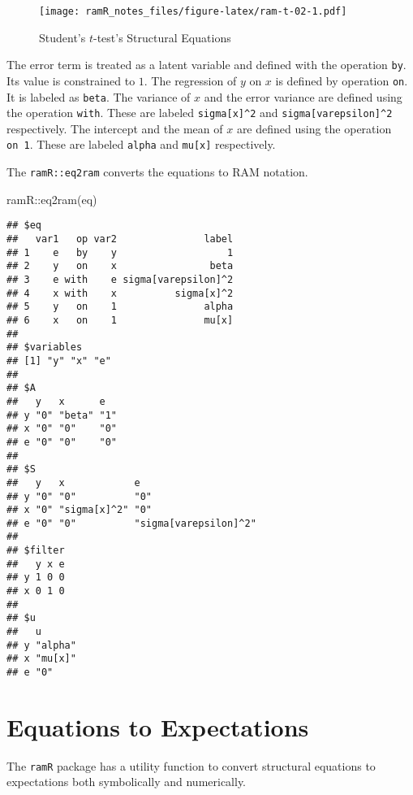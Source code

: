 \documentclass[
]{book}
\newenvironment{Shaded}{\begin{snugshade}}{\end{snugshade}}
\newcommand{\FunctionTok}[1]{\textcolor[rgb]{0.00,0.00,0.00}{#1}}
\newcommand{\NormalTok}[1]{#1}
\newcommand{\SpecialCharTok}[1]{\textcolor[rgb]{0.00,0.00,0.00}{#1}}
\theoremstyle{definition}
\theoremstyle{definition}
\theoremstyle{definition}
\theoremstyle{remark}
\begin{document}
\begin{figure}
\centering
\texttt{[image: ramR\_notes\_files/figure-latex/ram-t-02-1.pdf]}
\caption{\label{fig:ram-t-02}Student's \(t\)-test's Structural Equations}
\end{figure}

The error term is treated as a latent variable
and defined with the operation \texttt{by}.
Its value is constrained to \(1\).
The regression of \(y\) on \(x\) is defined by operation \texttt{on}.
It is labeled as \texttt{beta}.
The variance of \(x\) and the error variance
are defined using the operation \texttt{with}.
These are labeled \texttt{sigma{[}x{]}\^{}2} and \texttt{sigma{[}varepsilon{]}\^{}2} respectively.
The intercept and the mean of \(x\) are defined using the operation \texttt{on\ 1}.
These are labeled \texttt{alpha} and \texttt{mu{[}x{]}} respectively.

The \texttt{ramR::eq2ram} converts the equations to RAM notation.

\begin{Shaded}
\begin{Highlighting}[]
\NormalTok{ramR}\SpecialCharTok{::}\FunctionTok{eq2ram}\NormalTok{(eq)}
\end{Highlighting}
\end{Shaded}

\begin{verbatim}
## $eq
##   var1   op var2               label
## 1    e   by    y                   1
## 2    y   on    x                beta
## 3    e with    e sigma[varepsilon]^2
## 4    x with    x          sigma[x]^2
## 5    y   on    1               alpha
## 6    x   on    1               mu[x]
## 
## $variables
## [1] "y" "x" "e"
## 
## $A
##   y   x      e  
## y "0" "beta" "1"
## x "0" "0"    "0"
## e "0" "0"    "0"
## 
## $S
##   y   x            e                    
## y "0" "0"          "0"                  
## x "0" "sigma[x]^2" "0"                  
## e "0" "0"          "sigma[varepsilon]^2"
## 
## $filter
##   y x e
## y 1 0 0
## x 0 1 0
## 
## $u
##   u      
## y "alpha"
## x "mu[x]"
## e "0"
\end{verbatim}

\hypertarget{equations-to-expectations}{%
\section{Equations to Expectations}\label{equations-to-expectations}}

The \texttt{ramR} package has a utility function
to convert structural equations to expectations
both symbolically and numerically.
\end{document}
